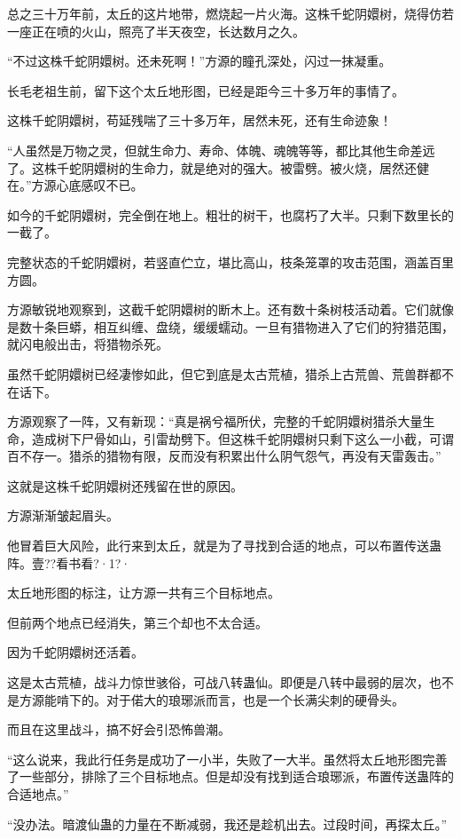 \begin{this_body}
总之三十万年前，太丘的这片地带，燃烧起一片火海。这株千蛇阴嬛树，烧得仿若一座正在喷的火山，照亮了半天夜空，长达数月之久。

“不过这株千蛇阴嬛树。还未死啊！”方源的瞳孔深处，闪过一抹凝重。

长毛老祖生前，留下这个太丘地形图，已经是距今三十多万年的事情了。

这株千蛇阴嬛树，苟延残喘了三十多万年，居然未死，还有生命迹象！

“人虽然是万物之灵，但就生命力、寿命、体魄、魂魄等等，都比其他生命差远了。这株千蛇阴嬛树的生命力，就是绝对的强大。被雷劈。被火烧，居然还健在。”方源心底感叹不已。

如今的千蛇阴嬛树，完全倒在地上。粗壮的树干，也腐朽了大半。只剩下数里长的一截了。

完整状态的千蛇阴嬛树，若竖直伫立，堪比高山，枝条笼罩的攻击范围，涵盖百里方圆。

方源敏锐地观察到，这截千蛇阴嬛树的断木上。还有数十条树枝活动着。它们就像是数十条巨蟒，相互纠缠、盘绕，缓缓蠕动。一旦有猎物进入了它们的狩猎范围，就闪电般出击，将猎物杀死。

虽然千蛇阴嬛树已经凄惨如此，但它到底是太古荒植，猎杀上古荒兽、荒兽群都不在话下。

方源观察了一阵，又有新现：“真是祸兮福所伏，完整的千蛇阴嬛树猎杀大量生命，造成树下尸骨如山，引雷劫劈下。但这株千蛇阴嬛树只剩下这么一小截，可谓百不存一。猎杀的猎物有限，反而没有积累出什么阴气怨气，再没有天雷轰击。”

这就是这株千蛇阴嬛树还残留在世的原因。

方源渐渐皱起眉头。

他冒着巨大风险，此行来到太丘，就是为了寻找到合适的地点，可以布置传送蛊阵。壹??看书看?·1?·

太丘地形图的标注，让方源一共有三个目标地点。

但前两个地点已经消失，第三个却也不太合适。

因为千蛇阴嬛树还活着。

这是太古荒植，战斗力惊世骇俗，可战八转蛊仙。即便是八转中最弱的层次，也不是方源能啃下的。对于偌大的琅琊派而言，也是一个长满尖刺的硬骨头。

而且在这里战斗，搞不好会引恐怖兽潮。

“这么说来，我此行任务是成功了一小半，失败了一大半。虽然将太丘地形图完善了一些部分，排除了三个目标地点。但是却没有找到适合琅琊派，布置传送蛊阵的合适地点。”

“没办法。暗渡仙蛊的力量在不断减弱，我还是趁机出去。过段时间，再探太丘。”


\end{this_body}
